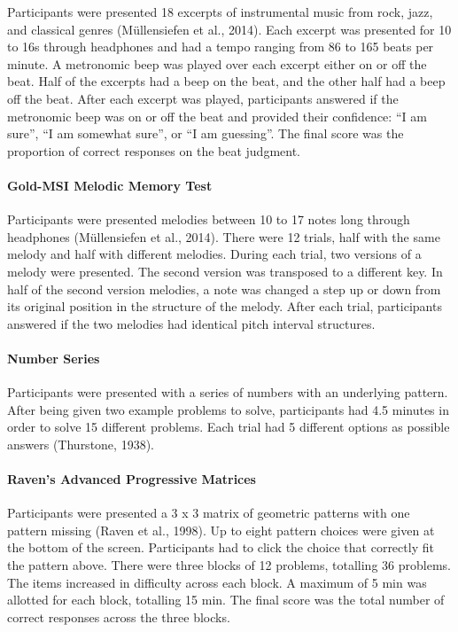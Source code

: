 \documentclass[]{book}
\let\oldparagraph\paragraph
\renewcommand{\paragraph}[1]{\oldparagraph{#1}\mbox{}}
\theoremstyle{definition}
\theoremstyle{definition}
\theoremstyle{definition}
\theoremstyle{remark}
\begin{document}
Participants were presented 18 excerpts of instrumental music from rock,
jazz, and classical genres (Müllensiefen et al., 2014). Each excerpt was
presented for 10 to 16s through headphones and had a tempo ranging from
86 to 165 beats per minute. A metronomic beep was played over each
excerpt either on or off the beat. Half of the excerpts had a beep on
the beat, and the other half had a beep off the beat. After each excerpt
was played, participants answered if the metronomic beep was on or off
the beat and provided their confidence: ``I am sure'', ``I am somewhat
sure'', or ``I am guessing''. The final score was the proportion of
correct responses on the beat judgment.

\hypertarget{gold-msi-melodic-memory-test}{%
\paragraph{Gold-MSI Melodic Memory
Test}\label{gold-msi-melodic-memory-test}}

Participants were presented melodies between 10 to 17 notes long through
headphones (Müllensiefen et al., 2014). There were 12 trials, half with
the same melody and half with different melodies. During each trial, two
versions of a melody were presented. The second version was transposed
to a different key. In half of the second version melodies, a note was
changed a step up or down from its original position in the structure of
the melody. After each trial, participants answered if the two melodies
had identical pitch interval structures.

\hypertarget{number-series}{%
\paragraph{Number Series}\label{number-series}}

Participants were presented with a series of numbers with an underlying
pattern. After being given two example problems to solve, participants
had 4.5 minutes in order to solve 15 different problems. Each trial had
5 different options as possible answers (Thurstone, 1938).

\hypertarget{ravens-advanced-progressive-matrices}{%
\paragraph{Raven's Advanced Progressive
Matrices}\label{ravens-advanced-progressive-matrices}}

Participants were presented a 3 x 3 matrix of geometric patterns with
one pattern missing (Raven et al., 1998). Up to eight pattern choices
were given at the bottom of the screen. Participants had to click the
choice that correctly fit the pattern above. There were three blocks of
12 problems, totalling 36 problems. The items increased in difficulty
across each block. A maximum of 5 min was allotted for each block,
totalling 15 min. The final score was the total number of correct
responses across the three blocks.
\end{document}
